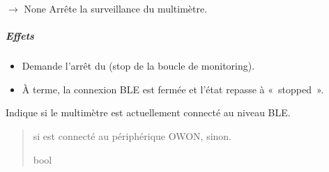 \documentclass[letterpaper,10pt,french]{sphinxmanual}
\begin{document}
\begin{fulllineitems}
\begin{fulllineitems}
\begin{itemize}
\end{itemize}

\end{fulllineitems}


\begin{fulllineitems}
\label{\detokenize{api/hardware.devices:hardware.devices.owon_multimeter.OwonMultimeterDriver.stop}}
\pysigstartsignatures
\pysiglinewithargsret
{}
{}
{{ $\rightarrow$ None}}
\pysigstopsignatures
\sphinxAtStartPar
Arrête la surveillance du multimètre.


\subparagraph{Effets}
\label{\detokenize{api/hardware.devices:id5}}\begin{itemize}
\item {} 
\sphinxAtStartPar
Demande l’arrêt du  (stop de la boucle de monitoring).

\item {} 
\sphinxAtStartPar
À terme, la connexion BLE est fermée et l’état repasse à « stopped ».

\end{itemize}

\end{fulllineitems}


\begin{fulllineitems}
\label{\detokenize{api/hardware.devices:hardware.devices.owon_multimeter.OwonMultimeterDriver.is_connected}}
\pysigstartsignatures
\pysigline
{}
\pysigstopsignatures
\sphinxAtStartPar
Indique si le multimètre est actuellement connecté au niveau BLE.
\begin{quote}\begin{description}
\sphinxAtStartPar
{} si  est connecté au périphérique OWON,
 sinon.

\sphinxAtStartPar
bool


\end{description}
\end{quote}
\end{fulllineitems}
\end{fulllineitems}
\end{document}
